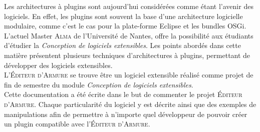 

Les architectures à plugins sont aujourd'hui considérées comme étant l'avenir des logiciels. En effet, les plugins sont souvent la base d’une architecture logicielle modulaire, comme c’est le cas pour la plate-forme Eclipse et les bundles OSGi.\\

L'actuel Master \textsc{Alma} de l’Université de Nantes, offre la possibilité aux étudiants d'étudier la \textit{Conception de logiciels extensibles}. Les points abordés dans cette matière présentent plusieurs techniques d'architectures à plugins, permettant de développer des logiciels extensibles. \\

L'\textsc{\'Editeur d'Armure} se trouve être un logiciel extensible réalisé comme projet de fin de semestre du module \textit{Conception de logiciels extensibles}.\\

Cette documentation a été écrite dans le but de commenter le projet \textsc{\'Editeur d'Armure}. Chaque particularité du logiciel y est décrite ainsi que des exemples de manipulations afin de permettre à n’importe quel développeur de pouvoir créer un plugin compatible avec l'\textsc{\'Editeur d'Armure}.

